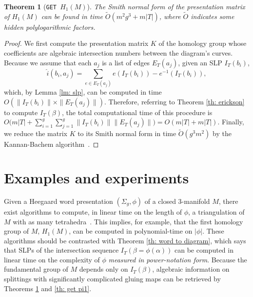 \documentclass[11pt]{amsart}
\numberwithin{equation}{section}
\theoremstyle{plain}
\newtheorem{theorem}[equation]{Theorem}
\theoremstyle{definition}
\begin{document}
\begin{theorem}[\texttt{GET }\texorpdfstring{$H_1(M)$}{H1(M)}]\label{th: get h1}
    The Smith normal form of the presentation matrix of $H_1(M)$ can be found in time $\widetilde{O}(m^2g^3+m|T|)$, where $\widetilde{O}$ indicates some hidden polylogarithmic factors.
\end{theorem}
\begin{proof}
    We first compute the presentation matrix $K$ of the homology group whose coefficients are algebraic intersection numbers between the diagram's curves. 
    Because we assume that each $a_j$ is a list of edges $E_T(a_j)$, given an SLP $I_T(b_i)$, 
\begin{equation*}
    \hat{i}(b_i,a_j)=\sum_{e\in E_T(a_j)} e(I_T(b_i))-e^{-1}(I_T(b_i)),
\end{equation*}
    which, by Lemma \ref{lm: slp}, can be computed in time $O(\|I_T(b_i)\|\times \|E_T(a_j)\|)$.
    Therefore, referring to Theorem \ref{th: erickson} to compute $I_T(\beta)$, the total computational time of this procedure is $O\bigg(m|T|+\sum_{i=1}^g\sum_{j=1}^g\|I_T(b_i)\| \|E_T(a_j)\|\bigg)=O(m|T|+m|T|)$. 
    Finally, we reduce the matrix $K$ to its Smith normal form in time $\widetilde{O}(g^3m^2)$ by the Kannan-Bachem algorithm~\cite{sergeraert2024kannanbachemalgorithm}.
\end{proof}

\section{Examples and experiments}\label{sec: examples and experiments}
Given a Heegaard word presentation $(\Sigma_g,\phi)$ of a closed 3-manifold $M$, there exist algorithms to compute, in linear time on the length of $\phi$, a triangulation of $M$ with as many tetrahedra~\cite{alagic2011quantum, alagic2014quantum, brinkmann2001computing,koenig2010quantum}.
This implies, for example, that the first homology group of $M$, $H_1(M)$, can be computed in polynomial-time on $|\phi|$.
These algorithms should be contrasted with Theorem \ref{th: word to diagram}, which says that SLPs of the intersection sequence $I_T(\beta= \phi(\alpha))$ can be computed in linear time on the complexity of $\phi$ \emph{measured in power-notation form}.
Because the fundamental group of $M$ depends only on $I_T(\beta)$, algebraic information on splittings with significantly complicated gluing maps can be retrieved by Theorems \ref{th: get h1} and \ref{th: get pi1}.
\end{document}
